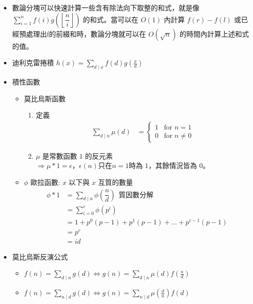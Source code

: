\begin{itemize}
\item 數論分塊可以快速計算一些含有除法向下取整的和式，就是像 $\sum_{i = 1} ^ {n} f(i) g(\left\lfloor\dfrac ni\right\rfloor)$ 的和式。當可以在 $O(1)$ 內計算 $f(r) - f(l)$ 或已經預處理出f的前綴和時，數論分塊就可以在 $O(\sqrt n)$ 的時間內計算上述和式的值。
\item 迪利克雷捲積 $h(x) = \sum_{d \mid x} f(d) g(\frac{x}{d})$
\item 積性函數
    \begin{itemize}
        \item 莫比烏斯函數
            \begin{enumerate}
                \item 定義
                $$ \begin{aligned}
                    \sum_{d \mid n} \mu (d)
                    &=
                    \begin{cases}
                        1 & \text{for } n = 1\\
                        0 & \text{for } n \neq 0
                    \end{cases}
                \end{aligned} $$

                \item $\mu$ 是常數函數 $1$ 的反元素\\
                $\Rightarrow \mu \ast 1 = \epsilon$，$\epsilon (n) \text{只在} n = 1 \text{時為 1，其餘情況皆為 0。}$
            \end{enumerate}

        \item $\phi$ 歐拉函數: $x$ 以下與 $x$ 互質的數量
        $$ \begin{aligned}
            \phi \ast 1
            &= \sum_{d \mid n} \phi(\dfrac {n}{d}) \ \ \text{質因數分解}\\
            &= \sum_{i = 0} ^ {c} \phi(p ^ i)\\
            &= 1 + p^0(p-1) + p^1(p-1) + ... + p^{c-1}(p-1)\\
            &= p^c\\
            &= id
        \end{aligned} $$
    \end{itemize}

\item 莫比烏斯反演公式
    \begin{itemize}
        \item $f(n)=\sum_{d\mid n}g(d)\Leftrightarrow g(n)=\sum_{d\mid n}\mu(d)f(\frac{n}{d})$
        \item $f(n)=\sum_{n\mid d}g(d)\Leftrightarrow g(n)=\sum_{n\mid d}\mu(\frac{d}{n})f(d)$
    \end{itemize}


\end{itemize}

